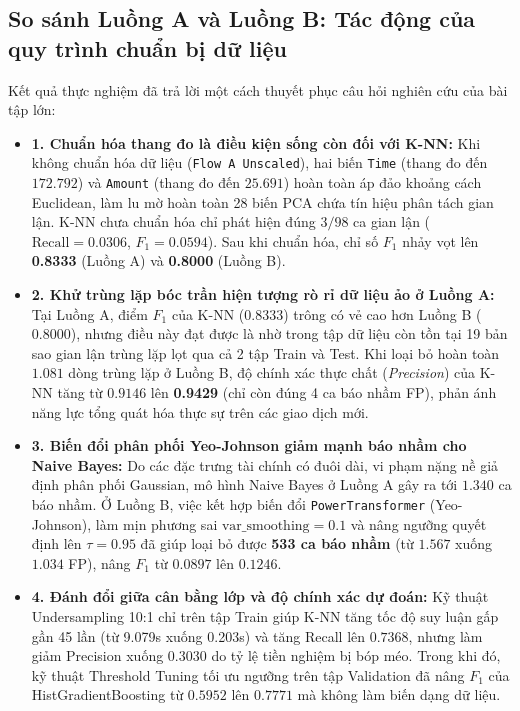 \documentclass[13pt,a4paper]{extarticle}
\begin{document}
\subsection{So sánh Luồng A và Luồng B: Tác động của quy trình chuẩn bị dữ liệu}
Kết quả thực nghiệm đã trả lời một cách thuyết phục câu hỏi nghiên cứu của bài tập lớn:
\begin{itemize}
    \item \textbf{1. Chuẩn hóa thang đo là điều kiện sống còn đối với K-NN:} Khi không chuẩn hóa dữ liệu (\texttt{Flow A Unscaled}), hai biến \texttt{Time} (thang đo đến $172.792$) và \texttt{Amount} (thang đo đến $25.691$) hoàn toàn áp đảo khoảng cách Euclidean, làm lu mờ hoàn toàn 28 biến PCA chứa tín hiệu phân tách gian lận. K-NN chưa chuẩn hóa chỉ phát hiện đúng $3/98$ ca gian lận ($\text{Recall} = 0.0306$, $F_1 = 0.0594$). Sau khi chuẩn hóa, chỉ số $F_1$ nhảy vọt lên \textbf{0.8333} (Luồng A) và \textbf{0.8000} (Luồng B).
    \item \textbf{2. Khử trùng lặp bóc trần hiện tượng rò rỉ dữ liệu ảo ở Luồng A:} Tại Luồng A, điểm $F_1$ của K-NN ($0.8333$) trông có vẻ cao hơn Luồng B ($0.8000$), nhưng điều này đạt được là nhờ trong tập dữ liệu còn tồn tại 19 bản sao gian lận trùng lặp lọt qua cả 2 tập Train và Test. Khi loại bỏ hoàn toàn $1.081$ dòng trùng lặp ở Luồng B, độ chính xác thực chất (\textit{Precision}) của K-NN tăng từ $0.9146$ lên \textbf{0.9429} (chỉ còn đúng 4 ca báo nhầm FP), phản ánh năng lực tổng quát hóa thực sự trên các giao dịch mới.
    \item \textbf{3. Biến đổi phân phối Yeo-Johnson giảm mạnh báo nhầm cho Naive Bayes:} Do các đặc trưng tài chính có đuôi dài, vi phạm nặng nề giả định phân phối Gaussian, mô hình Naive Bayes ở Luồng A gây ra tới $1.340$ ca báo nhầm. Ở Luồng B, việc kết hợp biến đổi \texttt{PowerTransformer} (Yeo-Johnson), làm mịn phương sai $\text{var\_smoothing} = 0.1$ và nâng ngưỡng quyết định lên $\tau = 0.95$ đã giúp loại bỏ được \textbf{533 ca báo nhầm} (từ $1.567$ xuống $1.034$ FP), nâng $F_1$ từ $0.0897$ lên $0.1246$.
    \item \textbf{4. Đánh đổi giữa cân bằng lớp và độ chính xác dự đoán:} Kỹ thuật Undersampling 10:1 chỉ trên tập Train giúp K-NN tăng tốc độ suy luận gấp gần 45 lần (từ 9.079s xuống 0.203s) và tăng Recall lên $0.7368$, nhưng làm giảm Precision xuống $0.3030$ do tỷ lệ tiền nghiệm bị bóp méo. Trong khi đó, kỹ thuật Threshold Tuning tối ưu ngưỡng trên tập Validation đã nâng $F_1$ của HistGradientBoosting từ $0.5952$ lên $0.7771$ mà không làm biến dạng dữ liệu.
\end{itemize}
\end{document}
